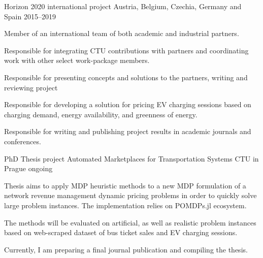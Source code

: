 

\begin{cventries}

  \cventry
    {Horizon 2020 international project} %
    {} %
    {Austria, Belgium, Czechia, Germany and  Spain} %
    {2015--2019} %
    {
      \begin{cvitems} %
        \item {Member of an international team of both academic and industrial partners.}
        \item {Responsible for integrating CTU contributions with partners and coordinating work with other select work-package members.}
        \item {Responsible for presenting concepts and solutions to the partners, writing and reviewing project }
        \item {Responsible for developing a solution for pricing EV charging sessions based on charging demand, energy availability, and greenness of energy.}
        \item {Responsible for writing and publishing project results in academic journals and conferences.}
      \end{cvitems}
    }

  \cventry
    {PhD Thesis project} %
    {Automated Marketplaces for Transportation Systems} %
    {CTU in Prague} %
    {ongoing} %
    {
      \begin{cvitems} %
        \item {Thesis aims to apply MDP heuristic methods to a new MDP formulation of a network revenue management dynamic pricing problems in order to quickly solve large problem instances. The implementation relies on POMDPs.jl ecosystem.}
        \item {The methods will be evaluated on artificial, as well as realistic problem instances based on web-scraped dataset of bus ticket sales and EV charging sessions.}
        \item {Currently, I am preparing a final journal publication and compiling the thesis.}
      \end{cvitems}
    }


\end{cventries}
